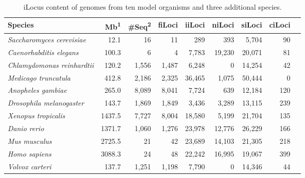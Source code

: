 \begin{table}[t]
\caption{iLocus content of genomes from ten model organisms and three additional species.}
\label{Table:iLocusCountsModOrg}
\begin{tabularx}{\textwidth}{lrrrrrrrr}
\hline
                            Species &  Mb\textsuperscript{1} &  \#Seq\textsuperscript{2} &       fiLoci &       iiLoci &       niLoci &       siLoci &       ciLoci   \\ \hline
\textit{Saccharomyces cerevisiae}   &                   12.1 &                        16 &           11 &          289 &          393 &        5,704 &           90   \\
\textit{Caenorhabditis elegans}     &                  100.3 &                         6 &            4 &        7,783 &       19,230 &       20,071 &           81   \\
\textit{Chlamydomonas reinhardtii}  &                  120.2 &                     1,556 &        1,487 &        6,248 &            0 &       14,254 &           42   \\
\textit{Medicago truncatula}        &                  412.8 &                     2,186 &        2,325 &       36,465 &        1,075 &       50,444 &            0   \\
\textit{Anopheles gambiae}          &                  265.0 &                     8,089 &        8,041 &        7,724 &          639 &       12,184 &          120   \\
\textit{Drosophila melanogaster}    &                  143.7 &                     1,869 &        1,849 &        3,436 &        3,289 &       13,115 &          239   \\
\textit{Xenopus tropicalis}         &                 1437.5 &                     7,727 &        8,004 &       18,580 &        5,199 &       21,704 &          135   \\
\textit{Danio rerio}                &                 1371.7 &                     1,060 &        1,276 &       23,978 &       12,776 &       26,229 &          166   \\
\textit{Mus musculus}               &                 2725.5 &                        21 &           42 &       23,689 &       14,103 &       21,305 &          218   \\
\textit{Homo sapiens}               &                 3088.3 &                        24 &           48 &       22,242 &       16,995 &       19,067 &          399   \\ \hline
\textit{Volvox carteri}             &                  137.7 &                     1,251 &        1,198 &        7,790 &            0 &       14,346 &           44   \\

\end{tabularx}
\end{table}
